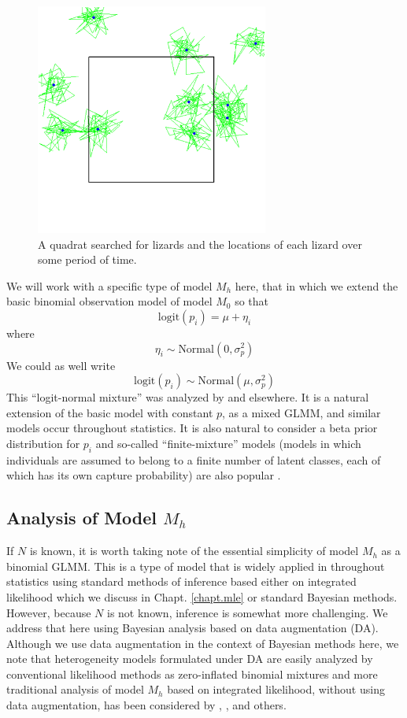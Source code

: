 \begin{figure}
\begin{center}
\includegraphics[height=3in]{Ch3/figs/quadrat}
\end{center}
\caption{A quadrat searched for lizards and the locations of each
  lizard over some period of time.}
\label{closed.fig.quadrat}
\end{figure}

We will work with a specific type of model $M_{h}$ here, that in which
we extend the basic binomial observation model of model $M_{0}$ so
that
\[
\mbox{logit}(p_{i}) = \mu + \eta_{i}
\]
where
\[
\eta_{i} \sim \mbox{Normal}(0, \sigma_{p}^2)
\]
We could as well write
\[
\mbox{logit}(p_{i}) \sim \mbox{Normal}(\mu,\sigma_{p}^2)
\]
This ``logit-normal mixture'' was analyzed by
\citet{coull_agresti:1999} and elsewhere. It is a natural extension of
the basic model with constant $p$, as a mixed GLMM, and similar models
occur throughout statistics. It is also natural to consider a beta
prior distribution for $p_{i}$ \citep{dorazio_royle:2003} and
so-called ``finite-mixture'' models (models in which individuals are assumed to 
belong to a finite number of latent classes, each of which has its own capture probability) 
are also popular
\citep{norris_pollock:1996, pledger:2000}.

\subsection{Analysis of Model $M_h$}

If $N$ is known, it is worth taking note of the essential simplicity
of model $M_h$ as a binomial GLMM.  This is a type of model that is
widely applied in throughout statistics using 
standard methods of inference based either on integrated likelihood
\citep{laird_ware:1982, berger_etal:1999} which we discuss in
Chapt. \ref{chapt.mle} or standard Bayesian
methods. However, because $N$ is not known, inference is somewhat more
challenging. We address that here using Bayesian analysis based on
data augmentation (DA). Although we use data augmentation in the context of
Bayesian methods here, we note that
heterogeneity models formulated under DA are easily analyzed by
conventional likelihood methods as zero-inflated binomial mixtures
\citep{royle:2006} and more traditional analysis of model $M_h$ based on
integrated likelihood, without using data augmentation, has been
considered by \citet{coull_agresti:1999}, \citet{dorazio_royle:2003},
and others.

